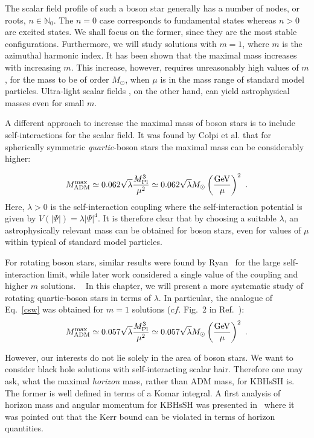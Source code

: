 The scalar field profile of such a boson star generally has a number of nodes, or roots, $n\in \mathbb{N}_0$. The $n=0$ case corresponds to fundamental states whereas $n>0$ are excited states. We shall focus on the former, since they are the most stable configurations.
Furthermore, we will study solutions with $m=1$, where $m$ is the azimuthal harmonic index.
It has been shown that the maximal mass increases with increasing $m$.\cite{Liebling:2012fv,Yoshida:1997qf,Grandclement:2014msa}
This increase, however, requires  unreasonably high values of $m$, for the mass to be of order $M_{\odot}$, when $\mu$ is in the mass range of standard model particles. Ultra-light scalar fields
, on the other hand, can yield astrophysical masses even for small $m$. 

A different approach to increase the maximal mass of boson stars is to include self-interactions for the scalar field.
It was found by Colpi et al.\cite{Colpi:1986ye} that for spherically symmetric \textit{quartic}-boson stars the maximal mass can be considerably higher:

\begin{equation}
 M_{\rm ADM}^{\rm max}\simeq 
0.062  \sqrt{\lambda}\frac{M_{\rm Pl}^3}{\mu^2}\simeq 0.062  \sqrt{\lambda}M_\odot \left(\frac{\rm GeV}{\mu}\right)^2\ .
\label{csw}
\end{equation}
Here, $\lambda>0$ is the self-interaction coupling where the self-interaction potential is given by $V(|\Psi|)=\lambda|\Psi|^4$.
It is therefore clear that by choosing a suitable $\lambda$, an astrophysically relevant mass can be obtained for boson stars, even for values of $\mu$ within typical of standard model particles.

For rotating boson stars, similar results were found by Ryan~\cite{Ryan:1996nk} for the large self-interaction limit, while later work considered a single value of the coupling and higher $m$ solutions.
~\cite{Grandclement:2014msa,Kleihaus:2015iea}
In this chapter, we will present a more systematic study of rotating quartic-boson stars in terms of $\lambda$.
In particular, the analogue of Eq.~\eqref{csw} was obtained for $m=1$ solutions ($cf.$ Fig.~2 in Ref.~\cite{Herdeiro:2015tia}):
%
\begin{equation}
M_{\rm ADM}^{\rm max}\simeq 
0.057  \sqrt{\lambda}\frac{M_{\rm Pl}^3}{\mu^2}\simeq 0.057  \sqrt{\lambda}M_\odot \left(\frac{\rm GeV}{\mu}\right)^2\ .
\label{quartic_rotating}
\end{equation}

However, our interests do not lie solely in the area of boson stars.
We want to consider black hole solutions with self-interacting scalar hair.
Therefore one may ask, what the maximal \textit{horizon} mass, rather than ADM mass, for KBHsSH is.
The former is well defined in terms of a Komar integral.
A first analysis of horizon mass and angular momentum for KBHsSH was presented in~\cite{Herdeiro:2015moa} where it was pointed out that the Kerr bound can be violated in terms of horizon quantities.

